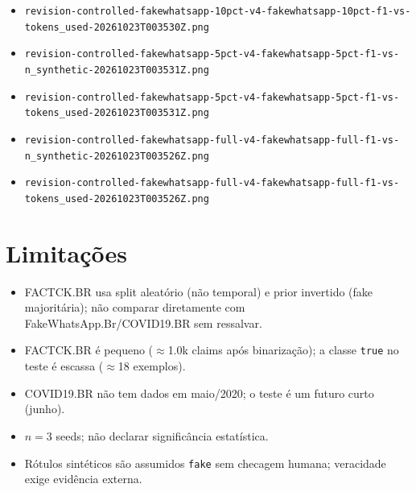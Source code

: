 \documentclass[conference]{IEEEtran}
\begin{document}
\begin{itemize}
\item \texttt{revision-controlled-fakewhatsapp-10pct-v4-fakewhatsapp-10pct-f1-vs-tokens\_used-20261023T003530Z.png}
\item \texttt{revision-controlled-fakewhatsapp-5pct-v4-fakewhatsapp-5pct-f1-vs-n\_synthetic-20261023T003531Z.png}
\item \texttt{revision-controlled-fakewhatsapp-5pct-v4-fakewhatsapp-5pct-f1-vs-tokens\_used-20261023T003531Z.png}
\item \texttt{revision-controlled-fakewhatsapp-full-v4-fakewhatsapp-full-f1-vs-n\_synthetic-20261023T003526Z.png}
\item \texttt{revision-controlled-fakewhatsapp-full-v4-fakewhatsapp-full-f1-vs-tokens\_used-20261023T003526Z.png}
\end{itemize}

\section{Limita\c{c}\~oes}

\begin{itemize}
\item FACTCK.BR usa split aleat\'orio (n\~ao temporal) e prior invertido (fake majorit\'aria); n\~ao comparar diretamente com FakeWhatsApp.Br/COVID19.BR sem ressalvar.
\item FACTCK.BR \'e pequeno (\ensuremath{\approx}1.0k claims ap\'os binariza\c{c}\~ao); a classe \texttt{true} no teste \'e escassa (\ensuremath{\approx}18 exemplos).
\item COVID19.BR n\~ao tem dados em maio/2020; o teste \'e um futuro curto (junho).
\item $n{=}3$ seeds; n\~ao declarar signific\^ancia estat\'istica.
\item R\'otulos sint\'eticos s\~ao assumidos \texttt{fake} sem checagem humana; veracidade exige evid\^encia externa.
\end{itemize}

\balance
\end{document}
